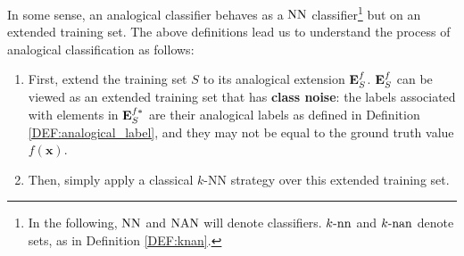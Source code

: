 In some sense, an analogical classifier behaves as a $\text{NN}$
classifier\footnote{In the following, $\text{NN}$ and $\mbox{NAN}$ will denote classifiers.
$k\text{-nn}$ and $k\text{-nan}$ denote sets, as in Definition \ref{DEF:knan}.} but
on an extended training set. The above definitions lead us to understand the
process of analogical classification as follows:
\begin{enumerate}
  \item First, extend the training set $S$ to its analogical extension
    $\mathbf{E}_{S}^{f}$. $\mathbf{E}_{S}^{f}$ can be viewed as an extended training set that has
    \textbf{class noise}: the labels associated with elements in $\mathbf{E}_{S}^{f*}$ are
    their analogical labels as defined in Definition
    \ref{DEF:analogical_label}, and they may not be equal to the ground truth
    value $f(\mathbf{x})$.
  \item Then, simply apply a classical $k$-NN strategy over this extended
    training set.
\end{enumerate}

